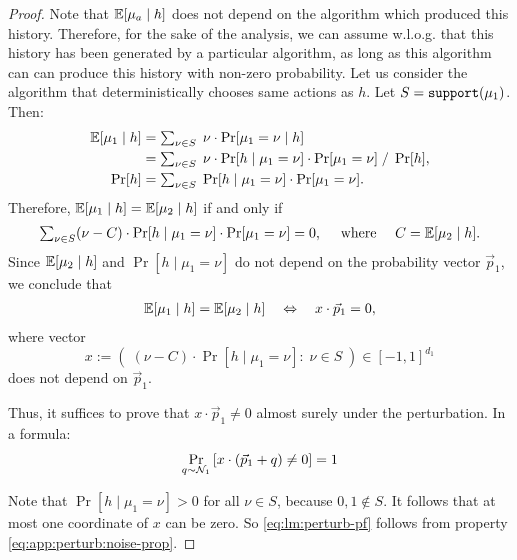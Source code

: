 \begin{proof}
Note that $\E[\mu_a\mid h]$ does not depend on the algorithm which produced this history. Therefore, for the sake of the analysis, we can assume w.l.o.g. that this history has been generated by a particular algorithm, as long as this algorithm can can produce this history with non-zero probability. Let us consider  the algorithm that deterministically chooses same actions as $h$. Let $S = \mathtt{support}(\mu_1)$. Then:
\begin{align*}
\E[\mu_1\mid h]
    &=\textstyle \sum_{\nu\in S}\; \nu \cdot \Pr[\mu_1 =\nu \mid h] \\
    &= \textstyle \sum_{\nu\in S}\; \nu \cdot \Pr[h \mid \mu_1 =\nu] \cdot \Pr[\mu_1=\nu]\;/\;\Pr[h], \\
\Pr[h]
    &=\textstyle \sum_{\nu\in S}\; \Pr[h \mid \mu_1 =\nu] \cdot \Pr[\mu_1=\nu].
\end{align*}
Therefore,
    $\E[\mu_1\mid h] = \E[\mu_2\mid h] $
if and only if
\begin{align*}
\textstyle
\sum_{\nu\in S} (\nu-C) \cdot \Pr[h \mid \mu_1 =\nu] \cdot \Pr[\mu_1=\nu] = 0,
\quad\text{ where }\quad C=\E[\mu_2\mid h].
\end{align*}
Since $\E[\mu_2\mid h]$ and $\Pr[h \mid \mu_1 =\nu]$ do not depend on the probability vector $\vec{p}_1$, we conclude that
\begin{align*}
  \E[\mu_1\mid h] = \E[\mu_2\mid h]
\quad\Leftrightarrow\quad x\cdot \vec{p}_1 =0,
\end{align*}
where vector
    \[ x := \left(\; (\nu-C) \cdot \Pr[h \mid \mu_1 =\nu]:\; \nu\in S\; \right) \in [-1,1]^{d_1}\]
does not depend on $\vec{p}_1$.

Thus, it suffices to prove that $x\cdot \vec{p}_1 \neq 0$ almost surely under the perturbation. In a formula:
\begin{align}\label{eq:lm:perturb-pf}
    \Pr_{q\sim \mathcal{N}_1}\left[ x\cdot( \vec{p}_1+q) \neq 0 \right] =1
\end{align}

Note that $\Pr[h \mid \mu_1 =\nu]>0$ for all $\nu\in S$, because $0,1\not\in S$. It follows that at most one coordinate of $x$ can be zero. So  \eqref{eq:lm:perturb-pf} follows from property \eqref{eq:app:perturb:noise-prop}.
\end{proof}
